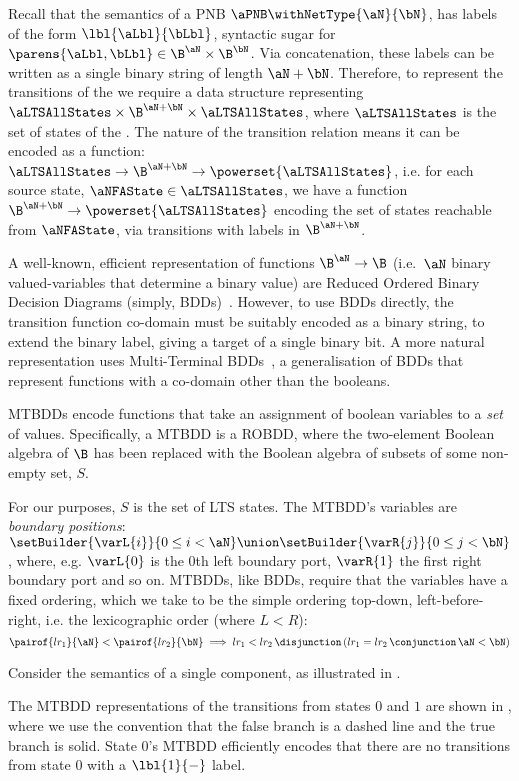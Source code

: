 Recall that the \TLTS{} semantics of a PNB $\aPNB \withNetType{\aN}{\bN}$, has
labels of the form $\lbl{\aLbl}{\bLbl}$, syntactic sugar for $\parens{\aLbl,
\bLbl} \in \B^\aN \times \B^\bN$. Via concatenation, these labels can be
written as a single binary string of length $\aN+\bN$. Therefore, to represent
the transitions of the \TLTS{} we require a data structure representing
$\aLTSAllStates \times \B^{\aN+\bN} \times \aLTSAllStates$, where
$\aLTSAllStates$ is the set of states of the \TLTS{}. The nature of the
transition relation means it can be encoded as a function: $\aLTSAllStates \to
\B^{\aN+\bN} \to \powerset{\aLTSAllStates}$, i.e. for each source state,
$\aNFAState \in \aLTSAllStates$, we have a function $\B^{\aN+\bN} \to
\powerset{\aLTSAllStates}$ encoding the set of states reachable from
$\aNFAState$, via transitions with labels in $\B^{\aN+\bN}$.

A well-known, efficient representation of functions $\B^\aN \to \B$ (i.e.\
$\aN$ binary valued-variables that determine a binary value) are Reduced
Ordered Binary Decision Diagrams (simply, BDDs)~\cite{Bryant1986}. However,
to use BDDs directly, the \TLTS{} transition function co-domain must be
suitably encoded as a binary string, to extend the binary label, giving a
target of a single binary bit. A more natural representation uses
Multi-Terminal BDDs~\cite{Clarke1993}, a generalisation of BDDs that represent
functions with a co-domain other than the booleans.

MTBDDs encode functions that take an assignment of boolean variables to a
\emph{set} of values. Specifically, a MTBDD is a ROBDD, where the two-element
Boolean algebra of $\B$ has been replaced with the Boolean algebra of subsets
of some non-empty set, $S$.

For our purposes, $S$ is the set of LTS states. The MTBDD's variables are
\emph{boundary positions}: $\setBuilder{\varL{i}}{0 \le i < \aN} \union
\setBuilder{\varR{j}}{0 \le j < \bN}$, where, e.g. $\varL{0}$ is the 0th left
boundary port, $\varR{1}$ the first right boundary port and so on. MTBDDs, like
BDDs, require that the variables have a fixed ordering, which we take to be the
simple ordering top-down, left-before-right, i.e. the lexicographic
order (where $L < R$):
\[
    \pairof{lr_1}{\aN} < \pairof{lr_2}{\bN} \implies lr_1 < lr_2
    \,\disjunction\, (lr_1 = lr_2 \,\conjunction\, \aN < \bN)
\]
\begin{example}
    Consider the \TNFA{} semantics of a single \bufferC{} component, as
    illustrated in \figref{fig:bufferCNFA}.

    The MTBDD representations of the transitions from states $0$ and $1$
    are shown in \figref{fig:MTBDDsbufferCNFA}, where we use the convention
    that the false branch is a dashed line and the true branch is solid. State
    $0$'s MTBDD efficiently encodes that there are no transitions from state
    $0$ with a $\lbl{1}{-}$ label.
\end{example}

